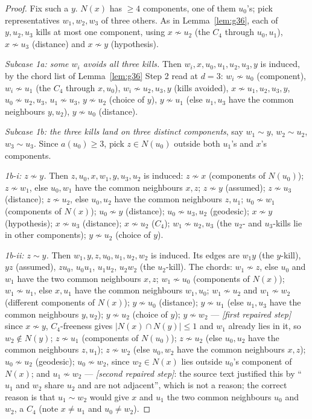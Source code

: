 \documentclass[11pt]{article}
\theoremstyle{plain}
\theoremstyle{definition}
\theoremstyle{remark}
\numberwithin{equation}{section}
\begin{document}
\begin{proof}
Fix such a $y$. $N(x)$ has $\ge 4$ components, one of them $u_0$'s; pick representatives
$w_1,w_2,w_3$ of three others. As in Lemma~\ref{lem:g36}, each of $y,u_2,u_3$ kills at most
one component, using $x\not\sim u_2$ (the $C_4$ through $u_0,u_1$), $x\not\sim u_3$
(distance) and $x \not\sim y$ (hypothesis).

\emph{Subcase 1a: some $w_i$ avoids all three kills.} Then
$w_i, x, u_0, u_1, u_2, u_3, y$ is induced, by the chord list of Lemma~\ref{lem:g36} Step 2
read at $d = 3$: $w_i\not\sim u_0$ (component), $w_i \not\sim u_1$ (the $C_4$ through
$x, u_0$), $w_i\not\sim u_2,u_3,y$ (kills avoided), $x \not\sim u_1,u_2,u_3,y$,
$u_0\not\sim u_2,u_3$, $u_1\not\sim u_3$, $y \not\sim u_2$ (choice of $y$), $y\not\sim u_1$
(else $u_1,u_3$ have the common neighbours $y,u_2$), $y \not\sim u_0$ (distance).

\emph{Subcase 1b: the three kills land on three distinct components}, say $w_1 \sim y$,
$w_2\sim u_2$, $w_3\sim u_3$. Since $a(u_0)\ge 3$, pick $z \in N(u_0)$ outside both $u_1$'s
and $x$'s components.

\emph{1b-i: $z \not\sim y$.} Then $z, u_0, x, w_1, y, u_3, u_2$ is induced:
$z\not\sim x$ (components of $N(u_0)$); $z \not\sim w_1$, else $u_0,w_1$ have the common
neighbours $x,z$; $z\not\sim y$ (assumed); $z \not\sim u_3$ (distance); $z \not\sim u_2$,
else $u_0,u_2$ have the common neighbours $z,u_1$; $u_0 \not\sim w_1$ (components of $N(x)$);
$u_0\not\sim y$ (distance); $u_0 \not\sim u_3,u_2$ (geodesic); $x \not\sim y$ (hypothesis);
$x \not\sim u_3$ (distance); $x\not\sim u_2$ ($C_4$); $w_1\not\sim u_2,u_3$ (the $u_2$- and
$u_3$-kills lie in other components); $y \not\sim u_2$ (choice of $y$).

\emph{1b-ii: $z \sim y$.} Then $w_1, y, z, u_0, u_1, u_2, w_2$ is induced. Its edges are
$w_1y$ (the $y$-kill), $yz$ (assumed), $zu_0$, $u_0u_1$, $u_1u_2$, $u_2w_2$ (the $u_2$-kill).
The chords: $w_1\not\sim z$, else $u_0$ and $w_1$ have the two common neighbours $x,z$;
$w_1\not\sim u_0$ (components of $N(x)$); $w_1\not\sim u_1$, else $x,u_1$ have the common
neighbours $w_1,u_0$; $w_1\not\sim u_2$ and $w_1 \not\sim w_2$ (different components of
$N(x)$); $y \not\sim u_0$ (distance); $y\not\sim u_1$ (else $u_1,u_3$ have the common
neighbours $y,u_2$); $y \not\sim u_2$ (choice of $y$); $y \not\sim w_2$ ---
\emph{[first repaired step]} since $x \not\sim y$, $C_4$-freeness gives
$|N(x)\cap N(y)|\le 1$ and $w_1$ already lies in it, so $w_2 \notin N(y)$;
$z\not\sim u_1$ (components of $N(u_0)$); $z \not\sim u_2$ (else $u_0,u_2$ have the common
neighbours $z,u_1$); $z\not\sim w_2$ (else $u_0,w_2$ have the common neighbours $x,z$);
$u_0\not\sim u_2$ (geodesic); $u_0 \not\sim w_2$, since $w_2 \in N(x)$ lies outside $u_0$'s
component of $N(x)$; and $u_1 \not\sim w_2$ --- \emph{[second repaired step]}: the source text
justified this by ``$u_1$ and $w_2$ share $u_2$ and are not adjacent'', which is not a
reason; the correct reason is that $u_1 \sim w_2$ would give $x$ and $u_1$ the two common
neighbours $u_0$ and $w_2$, a $C_4$ (note $x \ne u_1$ and $u_0 \ne w_2$).
\end{proof}
\end{document}

